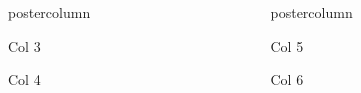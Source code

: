 \documentclass[final,hyperref={pdfpagelabels=false}]{beamer}
\newlength{\columnheight}
\begin{document}
\begin{frame}
\begin{columns}
\begin{column}{.32\textwidth}
\begin{beamercolorbox}[center,wd=\textwidth]{postercolumn}
\begin{minipage}[T]{.95\textwidth}
{\begin{block}{Col 3}
							
						\end{block}
						
						\begin{block}{Col 4}
							
							
							
						\end{block}
						
						
					}
				\end{minipage}
			\end{beamercolorbox}
		\end{column}
		
		\begin{column}{.32\textwidth}
			\begin{beamercolorbox}[center,wd=\textwidth]{postercolumn}
				\begin{minipage}[T]{.95\textwidth}  %
					\parbox[t][\columnheight]{\textwidth}{ %
						
						\begin{block}{Col 5}
							
							
						\end{block}
						
						\begin{block}{Col 6}
							
							
							
						\end{block}
						
						
					}
				\end{minipage}
			\end{beamercolorbox}
		\end{column}
	\end{columns}
	\end{frame}
\end{document}
